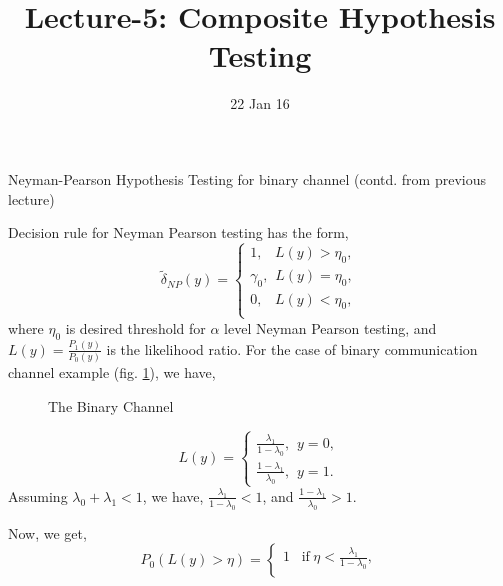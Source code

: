 \documentclass[a4paper,english,12pt]{article}
\title{Lecture-5: Composite Hypothesis Testing}
\date{22 Jan 16}
\begin{document}
\maketitle
\begin{exmp}{Neyman-Pearson Hypothesis Testing for binary channel (contd. from previous lecture)}
\par Decision rule for Neyman Pearson testing has the form,
\begin{equation}
\tilde{\delta}_{NP} (y)=
\begin{cases}
1,\hspace{10pt}L(y) > \eta_0,\\ 
\gamma_0,\hspace{5pt}L(y)= \eta_0,\\
0,\hspace{10pt}L(y) < \eta_0,\\
\end{cases}
\end{equation}
where $\eta_0$ is desired threshold for $\alpha$ level Neyman Pearson testing, and $ L(y) = \frac{{P}_1(y)}{{P}_0(y)} $ is the likelihood ratio. For the case of binary communication channel example (fig. \ref{fig:BSC}), we have,
\begin{figure}
\centering

\caption{The Binary Channel}
\label{fig:BSC}
\end{figure}
\begin{equation}
L(y) = \begin{cases}
\frac{\lambda_1}{1-\lambda_0},\hspace{5pt}y=0,  \\ 
\frac{1-\lambda_1}{\lambda_0},\hspace{5pt}y=1.
\end{cases}
\end{equation}
Assuming $\lambda_0 + \lambda_1 < 1$, we have,
$\frac{\lambda_1}{1-\lambda_0} < 1$, and $ \frac{1-\lambda_1}{\lambda_0} > 1$. 
\par Now, we get,
\begin{equation}
{P}_0 (L(y) > \eta)=\begin{cases}
1\hspace{10pt}\mbox{if}\hspace{3pt}\eta< \frac{\lambda_1}{1-\lambda_0},\\ 

\end{cases}
\end{equation}
\end{exmp}
\end{document}
